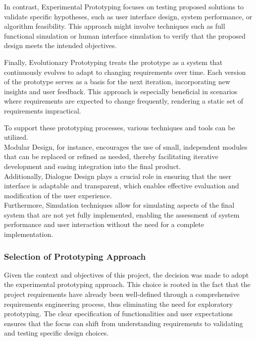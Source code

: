 In contrast, Experimental Prototyping focuses on testing proposed solutions to validate specific hypotheses, such as
user interface design, system performance, or algorithm feasibility. This approach might involve techniques such as full
functional simulation or human interface simulation to verify that the proposed design meets the intended objectives.
\autocite[cf.][p.8--10]{floydSystematicLookPrototyping1984}

Finally, Evolutionary Prototyping treats the prototype as a system that continuously evolves to adapt to changing
requirements over time. Each version of the prototype serves as a basis for the next iteration, incorporating new
insights and user feedback. This approach is especially beneficial in scenarios where requirements are expected to
change frequently, rendering a static set of requirements impractical.
\autocite[cf.][p.10--12]{floydSystematicLookPrototyping1984}

To support these prototyping processes, various techniques and tools can be utilized.
\autocite[cf.][p.12]{floydSystematicLookPrototyping1984} \\Modular Design, for instance, encourages the use of small,
independent modules that can be replaced or refined as needed, thereby facilitating iterative development and easing
integration into the final product.\autocite[cf.][p.12]{floydSystematicLookPrototyping1984} \\Additionally, Dialogue
Design plays a crucial role in ensuring that the user interface is adaptable and transparent, which enables effective
evaluation and modification of the user experience.\autocite[cf.][p.12]{floydSystematicLookPrototyping1984}
\\Furthermore, Simulation techniques allow for simulating aspects of the final system that are not yet fully
implemented, enabling the assessment of system performance and user interaction without the need for a complete
implementation.\autocite[cf.][p.13]{floydSystematicLookPrototyping1984}

\subsubsection{Selection of Prototyping Approach}\label{subsubsec:ptselection}

Given the context and objectives of this project, the decision was made to adopt the experimental prototyping approach.
This choice is rooted in the fact that the project requirements have already been well-defined through a comprehensive
requirements engineering process, thus eliminating the need for exploratory prototyping. The clear specification of
functionalities and user expectations ensures that the focus can shift from understanding requirements to validating and
testing specific design choices.

